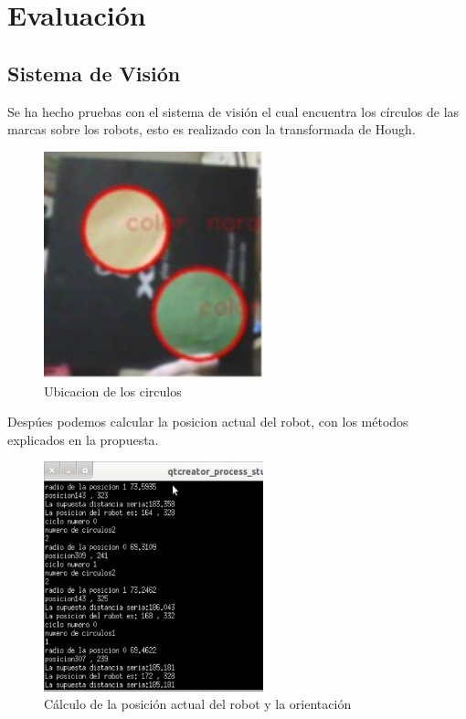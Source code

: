 
\chapter{Evaluaci\'on}
\section{Sistema de Visi\'on}
Se ha hecho pruebas con el sistema de visi\'on el cual encuentra los c\'irculos de las marcas sobre los robots, esto es realizado con la transformada de Hough.
\begin{figure}
	\centering
	\includegraphics[width=2.5in]{imagen7.jpg}
	
	\caption{Ubicacion de los circulos}
	\label{fig_mar}
\end{figure}

Desp\'ues podemos calcular la posicion actual del robot, con los m\'etodos explicados en la propuesta.
\begin{figure}
	\centering
	\includegraphics[width=2.5in]{imagen8.jpg}
	
	\caption{C\'alculo de la posici\'on actual del robot y la orientaci\'on}
	\label{fig_mar}
\end{figure}